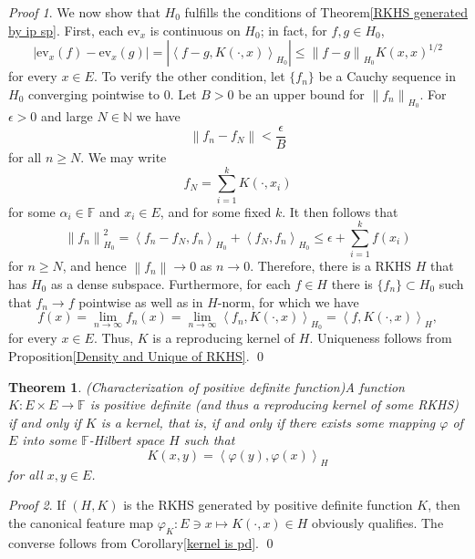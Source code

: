 \documentclass[a4paper,12pt]{article}
\newtheorem{thm}{Theorem}[section]
\theoremstyle{remark}
\newtheorem*{prf}{Proof}
\theoremstyle{definition}
\theoremstyle{definition}
\theoremstyle{definition}
\newcommand{\ip}[2]{\left<#1, #2 \right>}
\newcommand{\abs}[1]{\left| #1 \right|}
\newcommand{\norm}[1]{\left\| #1 \right\|}
\newcommand{\ev}[1]{\mathrm{ev}_{#1}}
\begin{document}
\begin{prf}
	We now show that \( H_0 \) fulfills the conditions of Theorem\ref{RKHS generated by ip sp}. First, each \( \ev{x} \) is continuous on \( H_0 \); in fact, for \( f, g \in H_0 \),
	\begin{equation*}
		\abs{\ev{x}(f)- \ev{x}(g)} = \abs{\ip{f-g}{K(\cdot ,x)}_{H_0}} \le \norm{f-g}_{H_0}K(x,x)^{1/2}
	\end{equation*}
	for every \( x \in E \). To verify the other condition, let \( \{f_n\} \) be a Cauchy sequence in \( H_0 \) converging pointwise to 0. Let \( B>0 \) be an upper bound for \( \norm{f_n}_{H_0} \). For \( \epsilon>0 \) and large \( N \in \mathbb{N} \) we have
	\begin{equation*}
		\norm{f_n - f_N} < \frac{\epsilon}{B}
	\end{equation*}
	for all \( n \ge N \). We may write
	\begin{equation*}
		f_N = \sum_{i=1}^{k} K(\cdot ,x_i)
	\end{equation*}
	for some \( \alpha_i \in \mathbb{F} \) and \( x_i \in E \), and for some fixed \( k \). It then follows that
	\begin{equation*}
		\norm{f_n}^2_{H_0} = \ip{f_n- f_N}{f_n}_{H_0} + \ip{f_N}{f_n}_{H_0}
		\le \epsilon + \sum_{i=1}^{k}f(x_i)
	\end{equation*}
	for \( n \ge N \), and hence \( \norm{f_n}\to 0 \) as \( n \to 0 \). Therefore, there is a RKHS \( H \) that has \( H_0 \) as a dense subspace.
	Furthermore, for each \( f \in H \) there is \( \{f_n\} \subset H_0 \) such that \( f_n \to f \) pointwise as well as in \( H \)-norm, for which we have
	\begin{equation*}
		f(x) = \lim_{n \to \infty} f_n(x)= \lim_{n \to \infty} \ip{f_n}{K(\cdot ,x)}_{H_0} = \ip{f}{K(\cdot ,x)}_H,
	\end{equation*}
	for every \( x \in E \). Thus, \( K \) is a reproducing kernel of \( H \). Uniqueness follows from Proposition\ref{Density and Unique of RKHS}.
	\qed\end{prf}

\begin{thm} (Characterization of positive definite function)\label{Characterization of pd}
	A function \( K:E \times E \to \mathbb{F} \) is positive definite (and thus a reproducing kernel of some RKHS) if and only if \( K \) is a kernel, that is, if and only if there exists some mapping \( \varphi \) of \( E \) into some  \( \mathbb{F} \)-Hilbert space \( H \) such that
	\begin{equation*}
		K(x,y) = \ip{\varphi(y)}{\varphi(x)}_H
	\end{equation*}
	for all \( x,y \in E \).
\end{thm}
\begin{prf}
	If \( (H,K) \) is the RKHS generated by positive definite function \( K \), then the canonical feature map \( \varphi_K:E \ni x \mapsto K(\cdot ,x) \in H \) obviously qualifies. The converse follows from Corollary\ref{kernel is pd}.
	\qed\end{prf}
\end{document}
